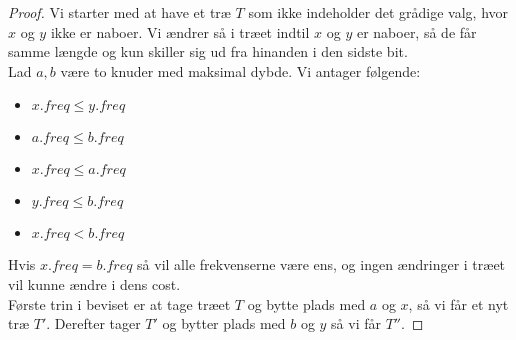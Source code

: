 \begin{proof}
Vi starter med at have et træ $T$ som ikke indeholder det grådige valg, hvor $x$ og $y$ ikke er naboer. Vi ændrer så i træet indtil $x$ og $y$ er naboer, så de får samme længde og kun skiller sig ud fra hinanden i den sidste bit.\\
Lad $a, b$ være to knuder med maksimal dybde. Vi antager følgende:
\begin{itemize}
    \item $x.freq \leq y.freq$
    \item $a.freq \leq b.freq$
    \item $x.freq \leq a.freq$
    \item $y.freq \leq b.freq$
    \item $x.freq < b.freq$
\end{itemize}
Hvis $x.freq = b.freq$ så vil alle frekvenserne være ens, og ingen ændringer i træet vil kunne ændre i dens cost.\\

Første trin i beviset er at tage træet $T$ og bytte plads med $a$ og $x$, så vi får et nyt træ $T'$. Derefter tager $T'$ og bytter plads med $b$ og $y$ så vi får $T''$.


\end{proof}
